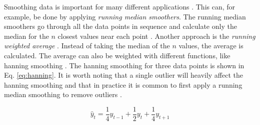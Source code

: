 Smoothing data is important for many different applications \cite{Bradley1997, Pang2002, Quinlan1992, Velleman1981}.
This can, for example, be done by applying \emph{running median smoothers}.
The running median smoothers go through all the data points in sequence and calculate only the median for the $n$ closest values near each point \cite{Velleman1981}.
Another approach is the \emph{running weighted average} \cite{Velleman1981}.
Instead of taking the median of the $n$ values, the average is calculated.
The average can also be weighted with different functions, like hanning smoothing \cite{Velleman1981}.
The hanning smoothing for three data points is shown in Eq. \ref{eq:hanning}.
It is worth noting that a single outlier will heavily affect the hanning smoothing and that in practice it is common to first apply a running median smoothing to remove outliers \cite{Velleman1981}.

\begin{equation}
    \hat y_t = \frac{1}{4} y_{t-1} + \frac{1}{2} y_t + \frac{1}{4} y_{t + 1} 
    \label{eq:hanning}
\end{equation}